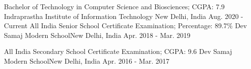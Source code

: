 

\begin{cventries}

  \cventry
    {Bachelor of Technology in Computer Science and Biosciences; CGPA: 7.9} %
    {Indraprastha Institute of Information Technology} %
    {New Delhi, India} %
    {Aug. 2020 - Current} %
    {}
  \cventry
      {All India Senior School Certificate Examination;  Percentage: 89.7\%}
      {Dev Samaj Modern School}{New Delhi, India}
        {Apr. 2018 - Mar. 2019}
        {}
    

  \cventry
    {All India Secondary School Certificate Examination;  CGPA: 9.6} %
    {Dev Samaj Modern School}{New Delhi, India} %
    {Apr. 2016 - Mar. 2017} %
    {}



\end{cventries}
